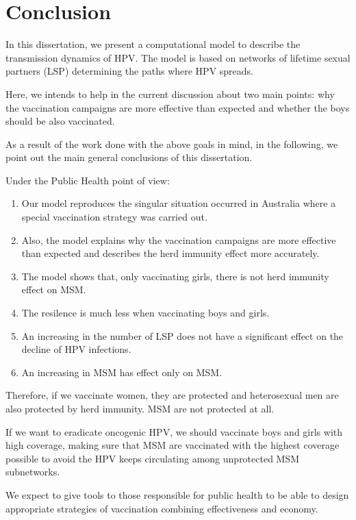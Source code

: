 \chapter{Conclusion}\label{conclusion}
In this dissertation, we present a computational model to describe the transmission dynamics of HPV. The model is based on networks of lifetime sexual partners (LSP) determining the paths where HPV spreads.

Here, we intends to help in the current discussion about two main points: why the vaccination campaigns are more effective than expected and whether the boys should be also vaccinated.  

As a result of the work done with the above goals in mind, in the following, we point out the main general conclusions of this dissertation.

Under the Public Health point of view:
\begin{enumerate}
	\item Our model reproduces the singular situation occurred in Australia where a special vaccination strategy was carried out.
	\item Also, the model explains why the vaccination campaigns are more effective than expected and describes the herd immunity effect more accurately.
	\item The model shows that, only vaccinating girls, there is not herd immunity effect on MSM.
	\item The resilence is much less when vaccinating boys and girls. 
	\item An increasing in the number of LSP does not have a significant effect on the decline of HPV infections.
	\item An increasing in MSM has effect only on MSM.
\end{enumerate}

Therefore, if we vaccinate women, they are protected and heterosexual men are also protected by herd immunity. MSM are not protected at all.

If we want to eradicate oncogenic HPV, we should vaccinate boys and girls with high coverage, making sure that MSM are vaccinated with the highest coverage possible to avoid the HPV keeps circulating among unprotected MSM subnetworks.

We expect to give tools to those responsible for public health to be able to design appropriate strategies of vaccination combining effectiveness and economy.

